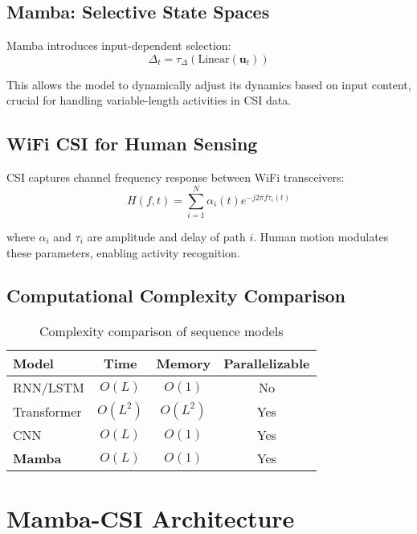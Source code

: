 \documentclass[10pt,conference]{IEEEtran}
\begin{document}
\subsection{Mamba: Selective State Spaces}

Mamba \cite{gu2023mamba} introduces input-dependent selection:
\begin{equation}
    \Delta_t = \tau_{\Delta}(\text{Linear}(\mathbf{u}_t))
\end{equation}

This allows the model to dynamically adjust its dynamics based on input content, crucial for handling variable-length activities in CSI data.

\subsection{WiFi CSI for Human Sensing}

CSI captures channel frequency response between WiFi transceivers:
\begin{equation}
    H(f, t) = \sum_{i=1}^{N} \alpha_i(t) e^{-j2\pi f \tau_i(t)}
\end{equation}

where $\alpha_i$ and $\tau_i$ are amplitude and delay of path $i$. Human motion modulates these parameters, enabling activity recognition.

\subsection{Computational Complexity Comparison}

\begin{table}[h]
\centering
\caption{Complexity comparison of sequence models}
\begin{tabular}{lccc}
\toprule
Model & Time & Memory & Parallelizable \\
\midrule
RNN/LSTM & $O(L)$ & $O(1)$ & No \\
Transformer & $O(L^2)$ & $O(L^2)$ & Yes \\
CNN & $O(L)$ & $O(1)$ & Yes \\
\textbf{Mamba} & $O(L)$ & $O(1)$ & Yes \\
\bottomrule
\end{tabular}
\end{table}

\section{Mamba-CSI Architecture}
\label{sec:architecture}
\end{document}
